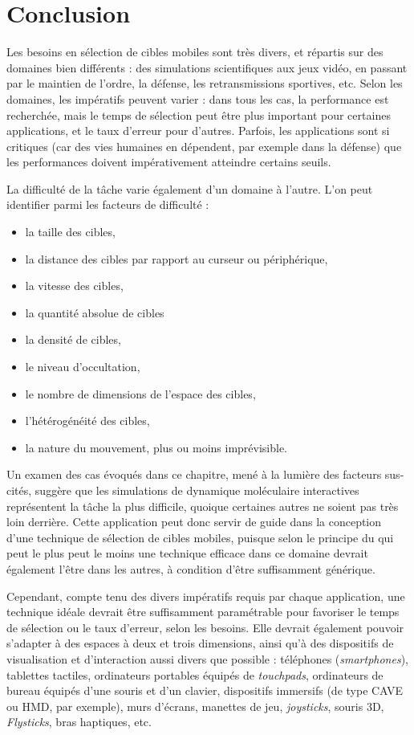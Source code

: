 	
	\section{Conclusion}    
	Les besoins en sélection de cibles mobiles sont très divers, et répartis sur des domaines bien différents : des simulations scientifiques aux jeux vidéo, en passant par le maintien de l'ordre, la défense, les retransmissions sportives, etc. Selon les domaines, les impératifs peuvent varier : dans tous les cas, la performance est recherchée, mais le temps de sélection peut être plus important pour certaines applications, et le taux d'erreur pour d'autres. Parfois, les applications sont si critiques (car des vies humaines en dépendent, par exemple dans la défense) que les performances doivent impérativement atteindre certains seuils.
	
	La difficulté de la tâche varie également d'un domaine à l'autre. L'on peut identifier parmi les facteurs de difficulté :
	\begin{itemize}
		\item la taille des cibles,
		\item la distance des cibles par rapport au \og curseur \fg{} ou périphérique,
		\item la vitesse des cibles,
		\item la quantité absolue de cibles
		\item la densité de cibles,
		\item le niveau d'occultation,
		\item le nombre de dimensions de l'espace des cibles,
		\item l'hétérogénéité des cibles,
		\item la nature du mouvement, plus ou moins imprévisible.
	\end{itemize}
	
	Un examen des cas évoqués dans ce chapitre, mené à la lumière des facteurs sus-cités, suggère que les simulations de dynamique moléculaire interactives représentent la tâche la plus difficile, quoique certaines autres ne soient pas très loin derrière. Cette application peut donc servir de guide dans la conception d'une technique de sélection de cibles mobiles, puisque selon le principe du \og qui peut le plus peut le moins \fg{} une technique efficace dans ce domaine devrait également l'être dans les autres, à condition d'être suffisamment générique.
	
	Cependant, compte tenu des divers impératifs requis par chaque application, une technique idéale devrait être suffisamment paramétrable pour favoriser le temps de sélection ou le taux d'erreur, selon les besoins. Elle devrait également pouvoir s'adapter à des espaces à deux et trois dimensions, ainsi qu'à des dispositifs de visualisation et d'interaction aussi divers que possible : téléphones (\emph{smartphones}), tablettes tactiles, ordinateurs portables équipés de \emph{touchpads}, ordinateurs de bureau équipés d'une souris et d'un clavier, dispositifs immersifs (de type CAVE ou HMD, par exemple), murs d'écrans, manettes de jeu, \emph{joysticks}, souris 3D, \emph{Flysticks}\footnotemark, bras haptiques, etc.
	

